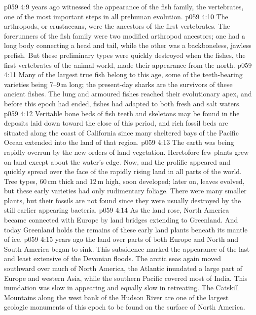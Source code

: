 \vs p059 4:9 \pc {} years ago witnessed the appearance of the fish family, the vertebrates, one of the most important steps in all prehuman evolution.
\vs p059 4:10 The arthropods, or crustaceans, were the ancestors of the first vertebrates. The forerunners of the fish family were two modified arthropod ancestors; one had a long body connecting a head and tail, while the other was a backboneless, jawless prefish. But these preliminary types were quickly destroyed when the fishes, the first vertebrates of the animal world, made their  appearance from the north.
\vs p059 4:11 Many of the largest true fish belong to this age, some of the teeth\hyp{}bearing varieties being 7--9\,m long; the present\hyp{}day sharks are the survivors of these ancient fishes. The lung and armoured fishes reached their evolutionary apex, and before this epoch had ended, fishes had adapted to both fresh and salt waters.
\vs p059 4:12 Veritable bone beds of fish teeth and skeletons may be found in the deposits laid down toward the close of this period, and rich fossil beds are situated along the coast of California since many sheltered bays of the Pacific Ocean extended into the land of that region.
\vs p059 4:13 The earth was being rapidly overrun by the new orders of land vegetation. Heretofore few plants grew on land except about the water’s edge. Now, and  the prolific  appeared and quickly spread over the face of the rapidly rising land in all parts of the world. Tree types, 60\,cm thick and 12\,m high, soon developed; later on, leaves evolved, but these early varieties had only rudimentary foliage. There were many smaller plants, but their fossils are not found since they were usually destroyed by the still earlier appearing bacteria.
\vs p059 4:14 As the land rose, North America became connected with Europe by land bridges extending to Greenland. And today Greenland holds the remains of these early land plants beneath its mantle of ice.
\vs p059 4:15 \pc {} years ago the land over parts of both Europe and North and South America began to sink. This subsidence marked the appearance of the last and least extensive of the Devonian floods. The arctic seas again moved southward over much of North America, the Atlantic inundated a large part of Europe and western Asia, while the southern Pacific covered most of India. This inundation was slow in appearing and equally slow in retreating. The Catskill Mountains along the west bank of the Hudson River are one of the largest geologic monuments of this epoch to be found on the surface of North America.
